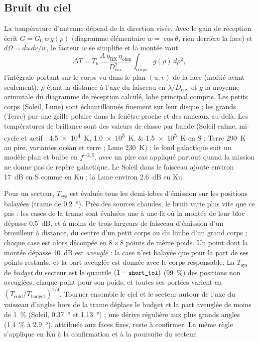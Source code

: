 \documentclass[11pt,a4paper]{article}
\newcommand{\code}[1]{\texttt{\small #1}}
\newcommand{\Tsys}{T_{\mathrm{sys}}}
\newcommand{\Denv}{D_{\mathrm{env}}}
\begin{document}
\subsection{Bruit du ciel}\label{sec:sky}
La température d'antenne dépend de la direction visée. Avec le gain de réception écrit $G = G_0\,w\,g(\rho)$
(diagramme élémentaire $w=\cos\theta$, rien derrière la face) et $d\Omega = du\,dv/w$, le facteur $w$ se simplifie et
la montée vaut
\[
  \Delta T = T_b\,\frac{A\,\eta_{\mathrm{RX}}\,\eta_{\mathrm{ohm}}}{\Denv^2}\int_{\text{corps}} g(\rho)\,d\rho^2,
\]
l'intégrale portant sur le corps vu dans le plan $(u,v)$ de la face (moitié avant seulement), $\rho$ étant la distance
à l'axe du faisceau en $\lambda/\Denv$ et $g$ la moyenne azimutale du diagramme de réception calculé, lobe principal
compris. Les petits corps (Soleil, Lune) sont échantillonnés finement sur leur disque ; les grands (Terre) par une
grille polaire dans la fenêtre proche et des anneaux au-delà. Les températures de brillance sont des valeurs de classe
par bande (Soleil calme, mi-cycle et actif : \SIlist{4.5e4;1.0e5;1.5e5}{K} en S ; Terre \SI{290}{K} au pire, variantes
océan et terre ; Lune \SI{230}{K}) ; le fond galactique suit un modèle plan et bulbe en $f^{-2,5}$, avec un pire cas
appliqué partout quand la mission ne donne pas de repère galactique. Le Soleil dans le faisceau ajoute environ
\SI{17}{dB} en S comme en Ku ; la Lune environ \SI{2.6}{dB} en Ku.

Pour un secteur, $\Tsys$ est évaluée tous les demi-lobes d'émission sur les positions balayées (trame de
\SI{0.2}{\degree}). Près des sources chaudes, le bruit varie plus vite que ce pas : les cases de la trame sont évaluées
une à une là où la montée de leur bloc dépasse \SI{0.5}{dB}, et à moins de trois largeurs de faisceau d'émission d'un
brouilleur à distance, du centre d'un petit corps ou du limbe d'un grand corps ; chaque case est alors découpée en
$8\times8$ points de même poids. Un point dont la montée dépasse \SI{10}{dB} est \emph{aveuglé} : la case n'est balayée
que pour la part de ses points restants, et la part aveuglée est donnée avec le corps responsable. La $\Tsys$ de
\emph{budget} du secteur est le quantile $(1-\text{\code{short\_tol}})$ (\SI{99}{\percent}) des positions non aveuglées,
chaque point pour son poids, et toutes ses portées varient en $(T_{\mathrm{cold}}/T_{\mathrm{budget}})^{1/4}$. Tourner
ensemble le ciel et le secteur autour de l'axe du vaisseau d'angles hors de la trame déplace le budget et la part
aveuglée de moins de \SI{1}{\percent} (Soleil, \SI{0.37}{\degree} et \SI{1.13}{\degree}) ; une dérive régulière aux
plus grands angles (\SI{1.4}{\percent} à \SI{2.9}{\degree}), attribuée aux faces fixes, reste à confirmer. La même
règle s'applique en Ku à la confirmation et à la poursuite du secteur.
\end{document}
